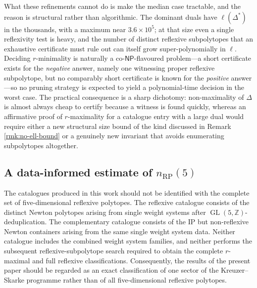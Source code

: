 \documentclass[appliedmath,article,submit,moreauthors]{Definitions/mdpi}
\newcommand{\Z}{\mathbb{Z}}
\newcommand{\GL}{\operatorname{GL}}
\begin{document}
What these refinements cannot do is make the median case tractable, and the
reason is structural rather than algorithmic. The dominant duals have
\(\ell(\Delta^*)\) in the thousands, with a maximum near \(3.6\times10^{5}\); at
that size even a single reflexivity test is heavy, and the number of distinct
reflexive subpolytopes that an exhaustive certificate must rule out can itself
grow super-polynomially in \(\ell\). Deciding \(r\)-minimality is naturally a
co-\(\mathsf{NP}\)-flavoured problem---a short certificate exists for the
\emph{negative} answer, namely one witnessing proper reflexive subpolytope, but
no comparably short certificate is known for the \emph{positive} answer---so no
pruning strategy is expected to yield a polynomial-time decision in the worst
case. The practical consequence is a sharp dichotomy: non-maximality of
\(\Delta\) is almost always cheap to certify because a witness is found quickly,
whereas an affirmative proof of \(r\)-maximality for a catalogue entry with a
large dual would require either a new structural size bound of the kind
discussed in Remark \ref{rmk:no-ell-bound} or a genuinely new invariant that avoids
enumerating subpolytopes altogether.

\subsection{A data-informed estimate of \texorpdfstring{\(n_{\mathrm{RP}}(5)\)}{nRP(5)}}
\label{sec:nrp5-estimate}

The catalogues produced in this work should not be identified with the complete
set of five-dimensional reflexive polytopes. The reflexive catalogue consists of
the distinct Newton polytopes arising from single weight systems after
\(\GL(5,\Z)\)-deduplication. The complementary catalogue consists of the IP but
non-reflexive Newton containers arising from the same single weight system data.
Neither catalogue includes the combined weight system families, and neither
performs the subsequent reflexive-subpolytope search required to obtain the
complete \(r\)-maximal and full reflexive classifications. Consequently, the
results of the present paper should be regarded as an exact classification of
one sector of the Kreuzer--Skarke programme rather than of all five-dimensional
reflexive polytopes.
\end{document}
